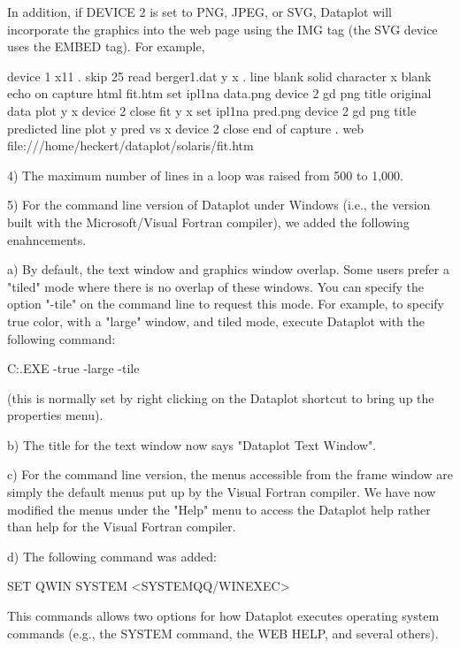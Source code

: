{    In addition, if DEVICE 2 is set to PNG, JPEG, or SVG, Dataplot
    will incorporate the graphics into the web page using the
    IMG tag (the SVG device uses the EMBED tag).  For example,

       device 1 x11
       .
       skip 25
       read berger1.dat y x
       .
       line blank solid
       character x blank
       echo on
       capture html fit.htm
       set ipl1na data.png
       device 2 gd png
       title original data
       plot y x
       device 2 close
       fit y x
       set ipl1na pred.png
       device 2 gd png
       title predicted line
       plot y pred vs x
       device 2 close
       end of capture
       .
       web file:///home/heckert/dataplot/solaris/fit.htm

 4) The maximum number of lines in a loop was raised from 500 to
    1,000.

 5) For the command line version of Dataplot under Windows (i.e.,
    the version built with the Microsoft/Visual Fortran compiler),
    we added the following enahncements.

    a) By default, the text window and graphics window overlap.
       Some users prefer a "tiled" mode where there is no overlap
       of these windows.  You can specify the option "-tile" on
       the command line to request this mode.  For example, to
       specify true color, with a "large" window, and tiled mode,
       execute Dataplot with the following command:

          C:\DATAPLOT\DATAPLOT.EXE  -true  -large  -tile

       (this is normally set by right clicking on the Dataplot
       shortcut to bring up the properties menu).

    b) The title for the text window now says "Dataplot Text
       Window".

    c) For the command line version, the menus accessible from
       the frame window are simply the default menus put up
       by the Visual Fortran compiler.  We have now modified
       the menus under the "Help" menu to access the Dataplot
       help rather than help for the Visual Fortran compiler.

    d) The following command was added:

          SET QWIN SYSTEM  <SYSTEMQQ/WINEXEC>

       This commands allows two options for how Dataplot
       executes operating system commands (e.g., the SYSTEM
       command, the WEB HELP, and several others).

}
